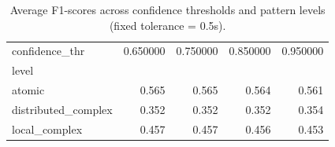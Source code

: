 \begin{table}[H]
\centering
\begin{table}
\caption{Average F1-scores across confidence thresholds and pattern levels (fixed tolerance = 0.5s).}
\label{tab:f1_confidence_summary_t5}
\begin{tabular}{lrrrr}
\toprule
confidence_thr & 0.650000 & 0.750000 & 0.850000 & 0.950000 \\
level &  &  &  &  \\
\midrule
atomic & 0.565 & 0.565 & 0.564 & 0.561 \\
distributed_complex & 0.352 & 0.352 & 0.352 & 0.354 \\
local_complex & 0.457 & 0.457 & 0.456 & 0.453 \\
\bottomrule
\end{tabular}
\end{table}
\end{table}
